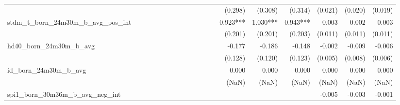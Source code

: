 \begin{tabular}{lrrrrrrrrrrrrrrrrrr}
                                            &              &              &              &              &              &              &              &              &               &              &              &               &      (0.298) &      (0.308) &       (0.314) &      (0.021) &      (0.020) &       (0.019) \\ 
stdm\_t\_born\_24m30m\_b\_avg\_pos\_int     &              &              &              &              &              &              &              &              &               &              &              &               &     0.923*** &     1.030*** &      0.943*** &        0.003 &        0.002 &         0.003 \\ 
                                            &              &              &              &              &              &              &              &              &               &              &              &               &      (0.201) &      (0.201) &       (0.203) &      (0.011) &      (0.011) &       (0.011) \\ 
hd40\_born\_24m30m\_b\_avg                  &              &              &              &              &              &              &              &              &               &              &              &               &       -0.177 &       -0.186 &        -0.148 &       -0.002 &       -0.009 &        -0.006 \\ 
                                            &              &              &              &              &              &              &              &              &               &              &              &               &      (0.128) &      (0.120) &       (0.123) &      (0.005) &      (0.008) &       (0.006) \\ 
id\_born\_24m30m\_b\_avg                    &              &              &              &              &              &              &              &              &               &              &              &               &        0.000 &        0.000 &         0.000 &        0.000 &        0.000 &         0.000 \\ 
                                            &              &              &              &              &              &              &              &              &               &              &              &               &        (NaN) &        (NaN) &         (NaN) &        (NaN) &        (NaN) &         (NaN) \\ 
spi1\_born\_30m36m\_b\_avg\_neg\_int        &              &              &              &              &              &              &              &              &               &              &              &               &              &              &               &       -0.005 &       -0.003 &        -0.001 \\ 

\end{tabular}
